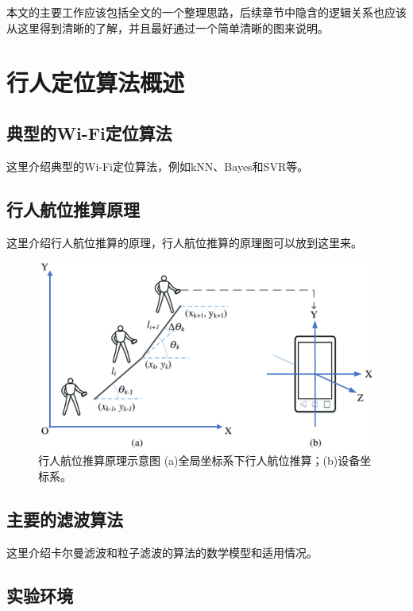 本文的主要工作应该包括全文的一个整理思路，后续章节中隐含的逻辑关系也应该从这里得到清晰的了解，并且最好通过一个简单清晰的图来说明。




\chapter{行人定位算法概述}

\section{典型的Wi-Fi定位算法}

这里介绍典型的Wi-Fi定位算法，例如kNN、Bayes和SVR等。

\section{行人航位推算原理}

这里介绍行人航位推算的原理，行人航位推算的原理图可以放到这里来。

\begin{figure}[htb]
	\centering
	\includegraphics[width=4.75in]{./figures/2/IndoorPos-PDRSchema}
	\caption{行人航位推算原理示意图 (a)全局坐标系下行人航位推算；(b)设备坐标系。}
	\label{fig-pdr}
\end{figure}

\section{主要的滤波算法}

这里介绍卡尔曼滤波和粒子滤波的算法的数学模型和适用情况。

\section{实验环境}

